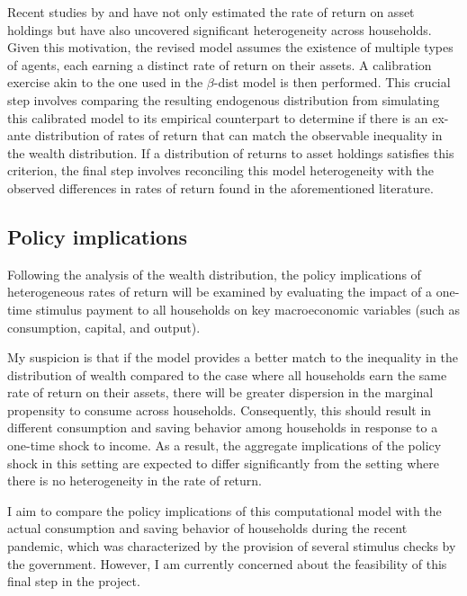\documentclass[\econtexRoot/PreproposalFinal]{subfiles}
\begin{document}
\par Recent studies by \cite{aflgdmlp20} and \cite{lblcps18} have not only estimated the rate of return on asset holdings but have also uncovered significant heterogeneity across households. Given this motivation, the revised model assumes the existence of multiple types of agents, each earning a distinct rate of return on their assets. A calibration exercise akin to the one used in the $\beta$-dist model is then performed. This crucial step involves comparing the resulting endogenous distribution from simulating this calibrated model to its empirical counterpart to determine if there is an ex-ante distribution of rates of return that can match the observable inequality in the wealth distribution. If a distribution of returns to asset holdings satisfies this criterion, the final step involves reconciling this model heterogeneity with the observed differences in rates of return found in the aforementioned literature.

\subsection{Policy implications}

\par Following the analysis of the wealth distribution, the policy implications of heterogeneous rates of return will be examined by evaluating the impact of a one-time stimulus payment to all households on key macroeconomic variables (such as consumption, capital, and output).

\par My suspicion is that if the model provides a better match to the inequality in the distribution of wealth compared to the case where all households earn the same rate of return on their assets, there will be greater dispersion in the marginal propensity to consume across households. Consequently, this should result in different consumption and saving behavior among households in response to a one-time shock to income. As a result, the aggregate implications of the policy shock in this setting are expected to differ significantly from the setting where there is no heterogeneity in the rate of return.

\par I aim to compare the policy implications of this computational model with the actual consumption and saving behavior of households during the recent pandemic, which was characterized by the provision of several stimulus checks by the government. However, I am currently concerned about the feasibility of this final step in the project.


\onlyinsubfile{}

\end{document}
